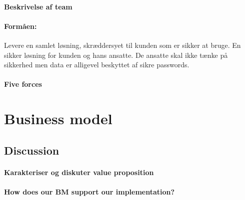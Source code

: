 \documentclass[a4paper]{article}
\begin{document}
\paragraph{Beskrivelse af team}
\paragraph{Formåen:}
Levere en samlet løsning, skræddersyet til kunden som er sikker at bruge.
En sikker løsning for kunden og hans ansatte.
De ansatte skal ikke tænke på sikkerhed men data er alligevel beskyttet af sikre passwords.

\paragraph{Five forces}

\section{Business model}

\subsection{Discussion}
\paragraph{Karakteriser og diskuter value proposition}
\paragraph{How does our BM support our implementation?}
\end{document}
